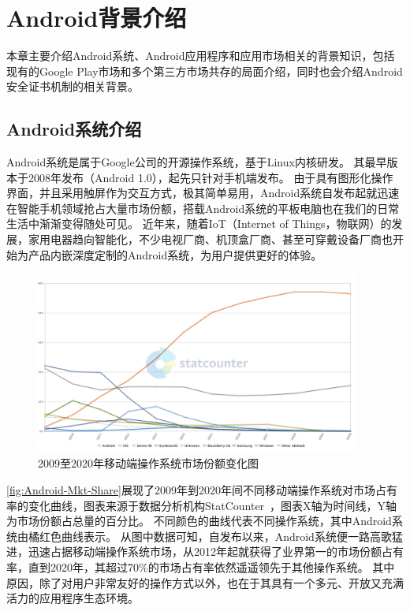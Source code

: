 \chapter{Android背景介绍}
\label{chp:background}

本章主要介绍Android系统、Android应用程序和应用市场相关的背景知识，包括现有的Google Play市场和多个第三方市场共存的局面介绍，同时也会介绍Android安全证书机制的相关背景。

\section{Android系统介绍}
Android系统是属于Google公司的开源操作系统，基于Linux内核研发。
其最早版本于2008年发布（Android 1.0），起先只针对手机端发布。
由于具有图形化操作界面，并且采用触屏作为交互方式，极其简单易用，Android系统自发布起就迅速在智能手机领域抢占大量市场份额，搭载Android系统的平板电脑也在我们的日常生活中渐渐变得随处可见。
近年来，随着IoT（Internet of Things，物联网）的发展，家用电器趋向智能化，不少电视厂商、机顶盒厂商、甚至可穿戴设备厂商也开始为产品内嵌深度定制的Android系统，为用户提供更好的体验。

\begin{figure}[htbp]
	\centering
	\includegraphics[width=0.95\textwidth]{./Figures/edwin-StatCounter-os-mkt-share-yearly-2009-2020.jpg}
	\caption{2009至2020年移动端操作系统市场份额变化图}
	\label{fig:Android-Mkt-Share}
	\vspace{-5mm}
\end{figure}

\autoref{fig:Android-Mkt-Share}展现了2009年到2020年间不同移动端操作系统对市场占有率的变化曲线，图表来源于数据分析机构StatCounter~\cite{MobileOSMktShare}，图表X轴为时间线，Y轴为市场份额占总量的百分比。
不同颜色的曲线代表不同操作系统，其中Android系统由橘红色曲线表示。
从图中数据可知，自发布以来，Android系统便一路高歌猛进，迅速占据移动端操作系统市场，从2012年起就获得了业界第一的市场份额占有率，直到2020年，其超过70\%的市场占有率依然遥遥领先于其他操作系统。
其中原因，除了对用户非常友好的操作方式以外，也在于其具有一个多元、开放又充满活力的应用程序生态环境。

